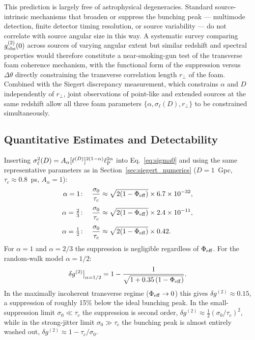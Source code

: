 \documentclass[aps,prd,onecolumn,amsmath,amssymb]{revtex4-2}
\begin{document}
This prediction is largely free of astrophysical degeneracies.
Standard source-intrinsic mechanisms that broaden or suppress the bunching
peak — multimode detection, finite detector timing resolution, or source
variability — do not correlate with source angular size in this way.
A systematic survey comparing $g^{(2)}_{\rm obs}(0)$ across sources of
varying angular extent but similar redshift and spectral properties would
therefore constitute a near-smoking-gun test of the transverse foam coherence
mechanism, with the functional form of the suppression versus $\Delta\theta$
directly constraining the transverse correlation length $r_\perp$ of the foam.
Combined with the Siegert discrepancy measurement, which constrains $\alpha$
and $D$ independently of $r_\perp$, joint observations of point-like and
extended sources at the same redshift allow all three foam parameters
$\{\alpha, \sigma_\ell(D), r_\perp\}$ to be constrained simultaneously.

\subsection{Quantitative Estimates and Detectability}
\label{sec:numerics}

Inserting $\sigma_\ell^2(D) = A_\alpha[\ell^{(D)}]^{2(1-\alpha)}\ell_{\rm P}^{2\alpha}$
into Eq.~\eqref{eq:sigma0} and using the same representative parameters as in
Section~\ref{sec:siegert_numerics} ($D = 1$~Gpc, $\tau_c \approx 0.8$~ps,
$A_\alpha = 1$):
\begin{align}
  \alpha = 1\colon\quad
    \frac{\sigma_0}{\tau_c}
    &\approx \sqrt{2(1-\Phi_{\rm eff})}\times 6.7\times10^{-32},
    \label{eq:ratio_alpha1}\\[4pt]
  \alpha = \tfrac{2}{3}\colon\quad
    \frac{\sigma_0}{\tau_c}
    &\approx \sqrt{2(1-\Phi_{\rm eff})}\times 2.4\times10^{-11},
    \label{eq:ratio_alpha23}\\[4pt]
  \alpha = \tfrac{1}{2}\colon\quad
    \frac{\sigma_0}{\tau_c}
    &\approx \sqrt{2(1-\Phi_{\rm eff})}\times 0.42.
    \label{eq:ratio_alpha12}
\end{align}
For $\alpha = 1$ and $\alpha = 2/3$ the suppression is negligible regardless
of $\Phi_{\rm eff}$.
For the random-walk model $\alpha = 1/2$:
\begin{equation}
  \delta g^{(2)}\big|_{\alpha=1/2}
  = 1 - \frac{1}{\sqrt{1 + 0.35\,(1 - \Phi_{\rm eff})}}.
  \label{eq:deltag2_alpha12}
\end{equation}
In the maximally incoherent transverse regime ($\Phi_{\rm eff} \to 0$) this
gives $\delta g^{(2)} \approx 0.15$, a suppression of roughly 15\% below the
ideal bunching peak.
In the small-suppression limit $\sigma_0 \ll \tau_c$ the suppression is second
order, $\delta g^{(2)} \approx \tfrac{1}{2}(\sigma_0/\tau_c)^2$, while in the
strong-jitter limit $\sigma_0 \gg \tau_c$ the bunching peak is almost entirely
washed out, $\delta g^{(2)} \approx 1 - \tau_c/\sigma_0$.
\end{document}
